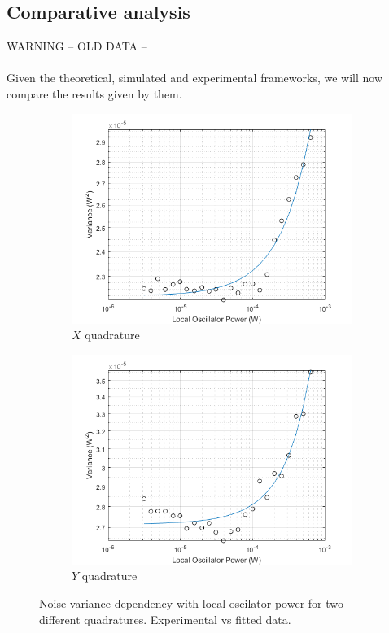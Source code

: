 \subsection{Comparative analysis}
%
WARNING -- OLD DATA --\\
\\
Given the theoretical, simulated and experimental frameworks, we will now compare the results given by them.
\\
%
\begin{figure}[H]
    \begin{subfigure}{.5\textwidth}
        \centering
        \includegraphics[width=.8\linewidth]{./sdf/quantum_noise/figures/noise_exp_channel1.png}
        \caption{$X$ quadrature}
        \label{fig:noise-exp-1}
    \end{subfigure}%
    \begin{subfigure}{.5\textwidth}
        \centering
        \includegraphics[width=.8\linewidth]{./sdf/quantum_noise/figures/noise_exp_channel3.png}
        \caption{$Y$ quadrature}
        \label{fig:noise-exp-3}
    \end{subfigure}
    \captionsetup{justification=centering}
    \caption{Noise variance dependency with local oscilator power for two different quadratures. Experimental vs fitted data.}
\end{figure}
